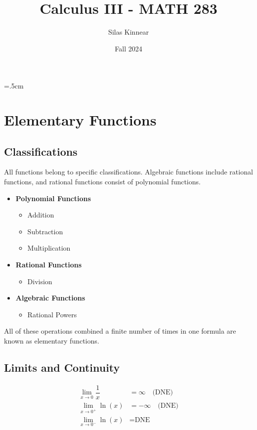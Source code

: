\documentclass[a4paper,12pt,openany]{book}
\begin{document}
\title{Calculus III - MATH 283}
\author{Silas Kinnear}
\date{Fall 2024}
\maketitle

\tableofcontents
{}
\parskip=.5cm
\parindent=0cm
\chapter{Elementary Functions}

\section{Classifications}
All functions belong to specific classifications. Algebraic functions include rational functions, and rational functions consist of polynomial functions.

\begin{itemize}
    \item \textbf{Polynomial Functions}
    \begin{itemize}
        \item Addition
        \item Subtraction
        \item Multiplication
    \end{itemize}
    \item \textbf{Rational Functions}
    \begin{itemize}
        \item Division
    \end{itemize}
    \item \textbf{Algebraic Functions}
    \begin{itemize}
        \item Rational Powers
    \end{itemize}
\end{itemize}
All of these operations combined a finite number of times in one formula are known as elementary functions.

\section{Limits and Continuity}

\begin{align*}
    \lim_{x \to 0} \dfrac{1}{x} &= \infty \quad \text{(DNE)} \\
    \lim_{x \to 0^+} \ln(x) &= -\infty \quad \text{(DNE)} \\
    \lim_{x \to 0^-} \ln(x) &= \text{DNE}
\end{align*}
\end{document}

